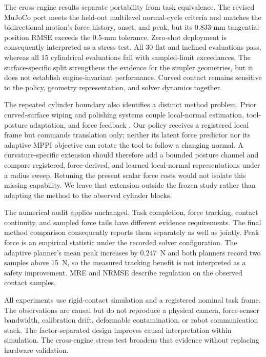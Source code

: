 The cross-engine results separate portability from task equivalence. The
revised MuJoCo port meets the held-out multilevel normal-cycle criteria and
matches the bidirectional motion's force history, onset, and peak, but its
0.833-mm tangential-position RMSE exceeds the 0.5-mm tolerance. Zero-shot
deployment is consequently interpreted as a stress test. All 30 flat and
inclined evaluations pass, whereas all 15 cylindrical evaluations fail with
sampled-limit exceedances. The surface-specific split strengthens the
evidence for the simpler geometries, but it does not establish engine-invariant
performance. Curved contact remains sensitive to the policy, geometry
representation, and solver dynamics together.

The repeated cylinder boundary also identifies a distinct method problem.
Prior curved-surface wiping and polishing systems couple local-normal
estimation, tool-posture adaptation, and force feedback
\cite{armesto2018constraintaware,li2023unknownsurface}.
Our policy receives a registered local frame but commands translation only;
neither its latent force predictor nor its adaptive MPPI objective can rotate
the tool to follow a changing normal. A curvature-specific extension should
therefore add a bounded posture channel and compare registered, force-derived,
and learned local-normal representations under a radius sweep. Retuning the
present scalar force costs would not isolate this missing capability. We leave
that extension outside the frozen study rather than adapting the method to the
observed cylinder blocks.

The numerical audit applies unchanged. Task completion, force tracking,
contact continuity, and sampled force tails have different evidence
requirements. The final method comparison consequently reports them
separately as well as jointly. Peak force is an empirical statistic under the
recorded solver configuration. The adaptive planner's mean peak increases by
0.247~N and both planners record two samples above 15~N, so the measured
tracking benefit is not interpreted as a safety improvement. MRE and NRMSE
describe regulation on the observed contact samples.

All experiments use rigid-contact simulation and a registered nominal task
frame. The observations are causal but do not reproduce a physical camera,
force-sensor bandwidth, calibration drift, deformable contamination, or robot
communication stack. The factor-separated design improves causal
interpretation within simulation. The cross-engine stress test broadens that
evidence without replacing hardware validation.
